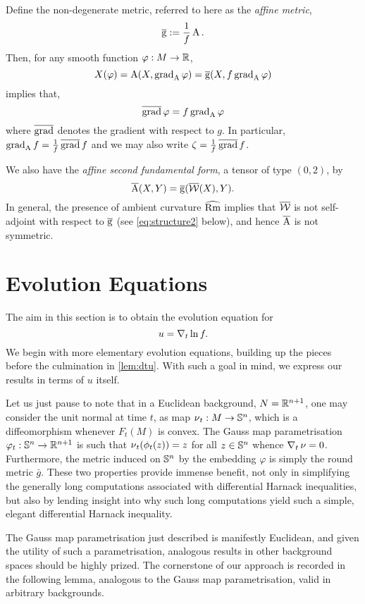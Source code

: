 \documentclass{amsart}
\begin{document}
Define the non-degenerate metric, referred to here as the \emph{affine metric},
\begin{equation}
\label{eq:affg}
\operatorname{\overline{\operatorname{g}}} := \frac{1}{f} \operatorname{A}.
\end{equation}
Then, for any smooth function $\varphi : M \to \mathbb{R}$,
\[
X(\varphi) = \operatorname{A}(X, \operatorname{grad}_{\operatorname{A}} \varphi) = \operatorname{\overline{\operatorname{g}}}(X, f \operatorname{grad}_{\operatorname{A}} \varphi)
\]
implies that,
\[
\operatorname{\overline{\operatorname{grad}}} \varphi = f \operatorname{grad}_{\operatorname{A}} \varphi
\]
where $\operatorname{\overline{\operatorname{grad}}}$ denotes the gradient with respect to $g$. In particular, $\operatorname{grad}_{\operatorname{A}} f = \tfrac{1}{f} \operatorname{\overline{\operatorname{grad}}} f$ and we may also write $\operatorname{\zeta} = \tfrac{1}{f} \operatorname{\overline{\operatorname{grad}}} f$.

We also have the \emph{affine second fundamental form}, a tensor of type $(0, 2)$, by
\[
\operatorname{\overline{\operatorname{A}}} (X, Y) = \operatorname{\overline{\operatorname{g}}}(\operatorname{\overline{\operatorname{\mathcal{W}}}}(X), Y).
\]
In general, the presence of ambient curvature $\operatorname{\widehat{Rm}}$ implies that $\operatorname{\overline{\operatorname{\mathcal{W}}}}$ is not self-adjoint with respect to $\operatorname{\overline{\operatorname{g}}}$ (see \eqref{eq:structure2} below), and hence $\operatorname{\overline{\operatorname{A}}}$ is not symmetric.

\section{Evolution Equations}


The aim in this section is to obtain the evolution equation for
\[
u = \operatorname{\nabla}_t \ln f.
\]
We begin with more elementary evolution equations, building up the pieces before the culmination in \cref{lem:dtu}. With such a goal in mind, we express our results in terms of $u$ itself.

Let us just pause to note that in a Euclidean background, $N = \mathbb{R}^{n+1}$, one may consider the unit normal at time $t$, as map $\operatorname{\nu}_t : M \to \mathbb{S}^n$, which is a diffeomorphism whenever $F_t(M)$ is convex. The Gauss map parametrisation $\varphi_t: \mathbb{S}^n \to \mathbb{R}^{n+1}$ \cite{MR1296393} is such that $\operatorname{\nu}_t(\phi_t(z)) = z$ for all $z \in \mathbb{S}^n$ whence $\operatorname{\nabla}_t \operatorname{\nu} = 0$. Furthermore, the metric induced on $\mathbb{S}^n$ by the embedding $\varphi$ is simply the round metric $\bar{g}$. These two properties provide immense benefit, not only in simplifying the generally long computations associated with differential Harnack inequalities, but also by lending insight into why such long computations yield such a simple, elegant differential Harnack inequality.

The Gauss map parametrisation just described is manifestly Euclidean, and given the utility of such a parametrisation, analogous results in other background spaces should be highly prized. The cornerstone of our approach is recorded in the following lemma, analogous to the Gauss map parametrisation, valid in arbitrary backgrounds.
\end{document}
